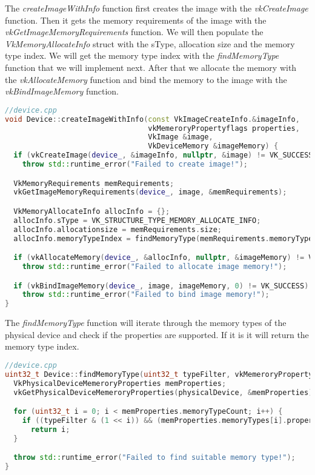 \documentclass[12pt]{report} \usepackage{preamble}
\begin{document}
The \textit{createImageWithInfo} function first creates the image with the \textit{vkCreateImage} function. Then it
gets the memory requirements of the image with the \textit{vkGetImageMemoryRequirements} function. We will then
populate the \textit{VkMemoryAllocateInfo} struct with the sType, allocation size and the memory type index. We will
get the memory type index with the \textit{findMemoryType} function that we will implement next. After that we
allocate the memory with the \textit{vkAllocateMemory} function and bind the memory to the image with the
\textit{vkBindImageMemory} function.

\begin{lstlisting}[language=C++]
//device.cpp
void Device::createImageWithInfo(const VkImageCreateInfo.&imageInfo, 
                                 vkMemeroryPropertyflags properties, 
                                 VkImage &image, 
                                 VkDeviceMemory &imageMemory) {
  if (vkCreateImage(device_, &imageInfo, nullptr, &image) != VK_SUCCESS)
    throw std::runtime_error("Failed to create image!");

  VkMemoryRequirements memRequirements;
  vkGetImageMemoryRequirements(device_, image, &memRequirements);

  VkMemoryAllocateInfo allocInfo = {};
  allocInfo.sType = VK_STRUCTURE_TYPE_MEMORY_ALLOCATE_INFO;
  allocInfo.allocationsize = memRequirements.size;
  allocInfo.memoryTypeIndex = findMemoryType(memRequirements.memoryTypeBits, properties);

  if (vkAllocateMemory(device_, &allocInfo, nullptr, &imageMemory) != VK_SUCCESS)
    throw std::runtime_error("Failed to allocate image memory!");

  if (vkBindImageMemory(device_, image, imageMemory, 0) != VK_SUCCESS)
    throw std::runtime_error("Failed to bind image memory!");
}
\end{lstlisting}

The \textit{findMemoryType} function will iterate through the memory types of the physical device and check if the
properties are supported. If it is it will return the memory type index.

\begin{lstlisting}[language=C++]
//device.cpp
uint32_t Device::findMemoryType(uint32_t typeFilter, vkMemeroryPropertyflags properties) {
  VkPhysicalDeviceMemeroryProperties memProperties;
  vkGetPhysicalDeviceMemeroryProperties(physicalDevice, &memProperties);

  for (uint32_t i = 0; i < memProperties.memoryTypeCount; i++) {
    if ((typeFilter & (1 << i)) && (memProperties.memoryTypes[i].propertyFlags & properties) == properties)
      return i;
  }

  throw std::runtime_error("Failed to find suitable memory type!");
}
\end{lstlisting}
\end{document}

